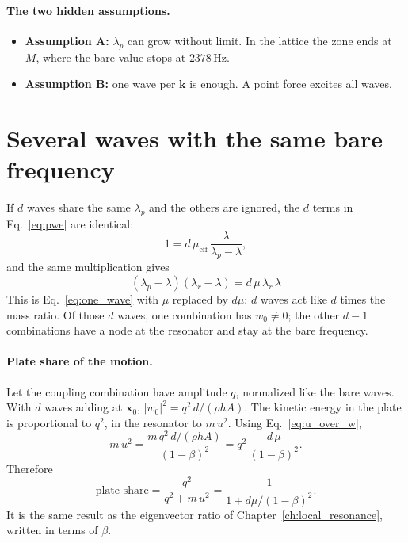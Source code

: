 \paragraph{The two hidden assumptions.}
\begin{itemize}
  \item \textbf{Assumption A:} $\lambda_p$ can grow without limit. In the
        lattice the zone ends at $M$, where the bare value stops at
        $2378\,\mathrm{Hz}$.
  \item \textbf{Assumption B:} one wave per $\mathbf{k}$ is enough. A point
        force excites all waves.
\end{itemize}

\section{Several waves with the same bare frequency}

If $d$ waves share the same $\lambda_p$ and the others are ignored, the $d$ terms
in Eq.~\eqref{eq:pwe} are identical:
\begin{equation}
  1 = d\,\mu_\mathrm{eff}\,\frac{\lambda}{\lambda_p - \lambda} ,
\end{equation}
and the same multiplication gives
\begin{equation}
  \boxed{\;(\lambda_p - \lambda)(\lambda_r - \lambda) = d\,\mu\,\lambda_r\,\lambda\;}
  \label{eq:d_waves}
\end{equation}
This is Eq.~\eqref{eq:one_wave} with $\mu$ replaced by $d\mu$: $d$ waves act like
$d$ times the mass ratio. Of those $d$ waves, one combination has $w_0 \neq 0$;
the other $d-1$ combinations have a node at the resonator and stay at the bare
frequency.

\paragraph{Plate share of the motion.}
Let the coupling combination have amplitude $q$, normalized like the bare waves.
With $d$ waves adding at $\mathbf{x}_0$, $|w_0|^2 = q^2\,d/(\rho h A)$. The
kinetic energy in the plate is proportional to $q^2$, in the resonator to
$m\,u^2$. Using Eq.~\eqref{eq:u_over_w},
\begin{equation}
  m\,u^2 = \frac{m\, q^2\, d/(\rho h A)}{(1-\beta)^2} = q^2\,\frac{d\,\mu}{(1-\beta)^2} .
\end{equation}
Therefore
\begin{equation}
  \text{plate share} = \frac{q^2}{q^2 + m\,u^2} = \frac{1}{1 + d\mu/(1-\beta)^2} .
  \label{eq:plate_share}
\end{equation}
It is the same result as the eigenvector ratio of
Chapter~\ref{ch:local_resonance}, written in terms of $\beta$.


